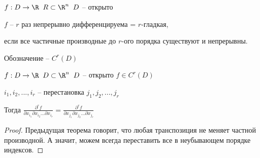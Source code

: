 \begin{definition}\slashns
	
	$f: D \to \R \;\; R\subset \R^n \;\; D$ -- открыто
	
	$f$ -- $r$ раз непрерывно дифференцируема = $r$-гладкая,
	
	если все частичные производные до $r$-ого порядка существуют и непрерывны.
	
	Обозначение -- $C^r(D)$
\end{definition}

\begin{theorem}\slashns
	
	$f: D \to \R \;\; D \subset \R^n \;\; D$ -- открыто $f \in C^r(D)$
	
	$i_1, i_2, ...,i_r$ -- перестановка $j_1, j_2, ... , j_r$
	
	Тогда $\frac{\partial^r f}{\partial x_{i_1} \partial x_{i_2}...\partial x_{i_r}  } = \frac{\partial^r f}{\partial x_{j_1} \partial x_{j_2}...\partial x_{j_r}  }$
\end{theorem}

\begin{proof}\slashns
	
	Предыдущая теорема говорит, что любая транспозиция не меняет частной производной. А значит, можем всегда переставить все в неубывающем порядке индексов.
\end{proof}

